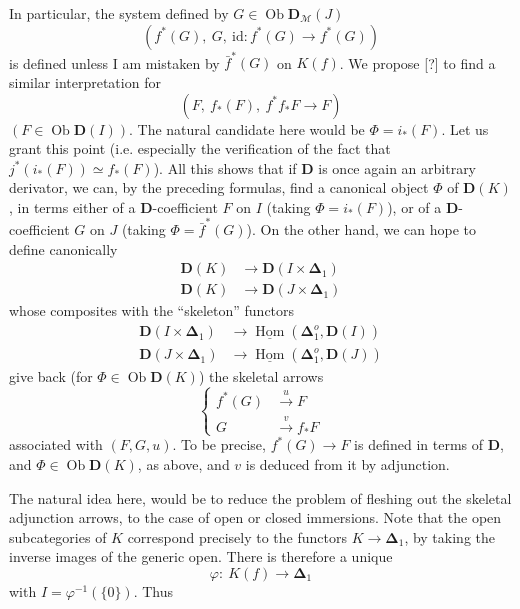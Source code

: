 \documentclass[11pt]{article}
\newcommand{\msp}[1]{\marginpar{\footnotesize [#1]}}
\newcommand{\uHom}{\underline{\operatorname{Hom}}}
\newcommand{\Ob}{\operatorname{Ob}}
\newcommand{\id}{\mathrm{id}}
\newcommand{\bDelta}{\boldsymbol{\Delta}}
\begin{document}
In particular, the system defined by $G \in \Ob \mathbf{D}_{\mathcal{M}}(J)$
\[ (f^*(G),\ G,\ \id : f^*(G) \longrightarrow f^*(G)) \]
is defined unless I am mistaken by $\bar{f}^*(G)$ on $K(f)$. We propose [?] to find a similar interpretation for
\[ (F,\ f_*(F),\ f^*f_*F \longrightarrow F) \]
$(F \in \Ob \mathbf{D}(I))$. The natural candidate here would be $\Phi = i_*(F)$. Let us grant this point (i.e. especially the verification of the fact that $j^*(i_*(F)) \simeq f_*(F)$). All this shows that if $\mathbf{D}$ is once again an arbitrary derivator, we can, by the preceding formulas, find a canonical object $\Phi$ of $\mathbf{D}(K)$, in terms either of a $\mathbf{D}$-coefficient $F$ on $I$ (taking $\Phi = i_*(F)$), or of a $\mathbf{D}$-coefficient $G$ on $J$ (taking $\Phi = \bar{f}^*(G)$). On the other hand, we can hope to define canonically
\[
\begin{aligned}
\mathbf{D}(K) &\longrightarrow \mathbf{D}(I \times \bDelta_1)\\
\mathbf{D}(K) &\longrightarrow \mathbf{D}(J \times \bDelta_1)
\end{aligned}
\]
whose composites with the ``skeleton'' functors
\[
\begin{aligned}
\mathbf{D}(I \times \bDelta_1) &\longrightarrow \uHom(\bDelta_1^o, \mathbf{D}(I))\\
\mathbf{D}(J \times \bDelta_1) &\longrightarrow \uHom(\bDelta_1^o, \mathbf{D}(J))
\end{aligned}
\]
\msp{page 83}
give back (for $\Phi \in \Ob \mathbf{D}(K)$) the skeletal arrows
\[
\left\{
\begin{aligned}
f^*(G) &\xrightarrow{\ u\ } F\\
G &\xrightarrow{\ v\ } f_*F
\end{aligned}
\right.
\]
associated with $(F,G,u)$. To be precise, $f^*(G) \longrightarrow F$ is defined in terms of $\mathbf{D}$, and $\Phi \in \Ob \mathbf{D}(K)$, as above, and $v$ is deduced from it by adjunction.

The natural idea here, would be to reduce the problem of fleshing out the skeletal adjunction arrows, to the case of open or closed immersions. Note that the open subcategories of $K$ correspond precisely to the functors $K \longrightarrow \bDelta_1$, by taking the inverse images of the generic open. There is therefore a unique %
\[ \varphi :\ K(f) \longrightarrow \bDelta_1 \]
with $I = \varphi^{-1}(\{0\})$. Thus
\end{document}
